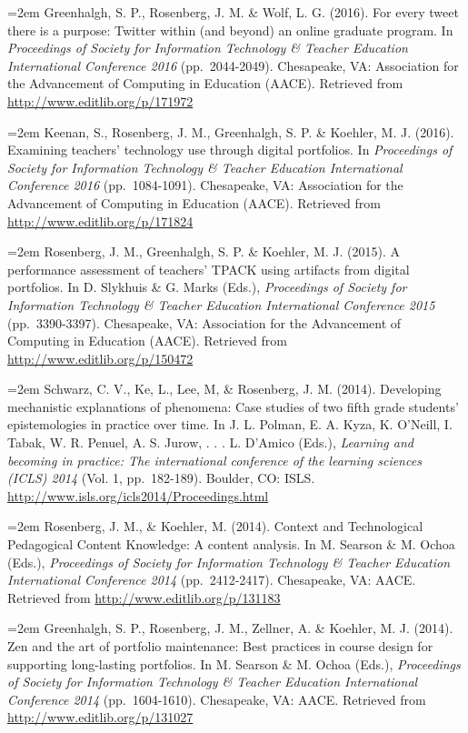 \documentclass[14,]{article}
\begin{document}
\hangindent=2em Greenhalgh, S. P., Rosenberg, J. M. \& Wolf, L. G.
(2016). For every tweet there is a purpose: Twitter within (and beyond)
an online graduate program. In \emph{Proceedings of Society for
Information Technology \& Teacher Education International Conference
2016} (pp.~2044-2049). Chesapeake, VA: Association for the Advancement
of Computing in Education (AACE). Retrieved from
\url{http://www.editlib.org/p/171972}

\hangindent=2em Keenan, S., Rosenberg, J. M., Greenhalgh, S. P. \&
Koehler, M. J. (2016). Examining teachers' technology use through
digital portfolios. In \emph{Proceedings of Society for Information
Technology \& Teacher Education International Conference 2016}
(pp.~1084-1091). Chesapeake, VA: Association for the Advancement of
Computing in Education (AACE). Retrieved from
\url{http://www.editlib.org/p/171824}

\hangindent=2em Rosenberg, J. M., Greenhalgh, S. P. \& Koehler, M. J.
(2015). A performance assessment of teachers' TPACK using artifacts from
digital portfolios. In D. Slykhuis \& G. Marks (Eds.), \emph{Proceedings
of Society for Information Technology \& Teacher Education International
Conference 2015} (pp.~3390-3397). Chesapeake, VA: Association for the
Advancement of Computing in Education (AACE). Retrieved from
\url{http://www.editlib.org/p/150472}

\hangindent=2em Schwarz, C. V., Ke, L., Lee, M, \& Rosenberg, J. M.
(2014). Developing mechanistic explanations of phenomena: Case studies
of two fifth grade students' epistemologies in practice over time. In J.
L. Polman, E. A. Kyza, K. O'Neill, I. Tabak, W. R. Penuel, A. S. Jurow,
. . . L. D'Amico (Eds.), \emph{Learning and becoming in practice: The
international conference of the learning sciences (ICLS) 2014} (Vol. 1,
pp.~182-189). Boulder, CO: ISLS.
\url{http://www.isls.org/icls2014/Proceedings.html}

\hangindent=2em Rosenberg, J. M., \& Koehler, M. (2014). Context and
Technological Pedagogical Content Knowledge: A content analysis. In M.
Searson \& M. Ochoa (Eds.), \emph{Proceedings of Society for Information
Technology \& Teacher Education International Conference 2014}
(pp.~2412-2417). Chesapeake, VA: AACE. Retrieved from
\url{http://www.editlib.org/p/131183}

\hangindent=2em Greenhalgh, S. P., Rosenberg, J. M., Zellner, A. \&
Koehler, M. J. (2014). Zen and the art of portfolio maintenance: Best
practices in course design for supporting long-lasting portfolios. In M.
Searson \& M. Ochoa (Eds.), \emph{Proceedings of Society for Information
Technology \& Teacher Education International Conference 2014}
(pp.~1604-1610). Chesapeake, VA: AACE. Retrieved from
\url{http://www.editlib.org/p/131027}
\end{document}
